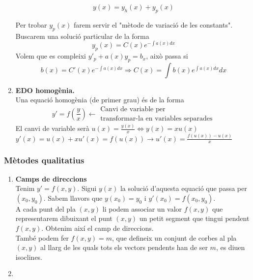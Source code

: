 \documentclass[../main.tex]{subfiles}
\begin{document}
\begin{enumerate}
\begin{corolari}
        \begin{displaymath}
            y(x) = y_h(x) + y_p(x)
        \end{displaymath}
    \end{corolari}
    Per trobar $y_p(x)$ farem servir el "mètode de variació de les constants".
    Buscarem una solució particular de la forma \begin{displaymath}
        y_p(x) = C(x)e^{-\int a(x) dx}
    \end{displaymath}
    Volem que es compleixi $y'_p + a(x)y_p = b_x$, això passa si
    \begin{displaymath}
        b(x) = C'(x)e^{-\int a(x) dx} \Rightarrow C(x) = \int b(x)e^{\int a(x)dx}dx
    \end{displaymath}
    \item \textbf{EDO homogènia.}\\
    Una equació homogènia (de primer grau) és de la forma
    \begin{displaymath}
        y' = f\left(\frac{y}{x}\right) \leftarrow \substack{\text{Canvi de variable per}\\\text{transformar-la en variables separades}}
    \end{displaymath}
    El canvi de variable serà $u(x) = \frac{y(x)}{x} \Leftrightarrow y(x) = xu(x)$\\
    $y'(x) = u(x) + xu'(x) = f(u(x)) \rightarrow u'(x) = \frac{f(u(x))-u(x)}{x}$
\end{enumerate}
\subsubsection{Mètodes qualitatius}
\begin{enumerate}
    \item \textbf{Camps de direccions}\\
    Tenim $y' = f(x,y)$. Sigui $y(x)$ la solució d'aquesta equació que passa per $(x_0, y_0)$. Sabem
    llavors que $y(x_0) = y_0$ i $y'(x_0) = f(x_0, y_0)$.\\
    A cada punt del pla $(x, y)$ li podem associar un valor $f(x,y)$ que representarem dibuixant el
    punt $(x,y)$ un petit segment que tingui pendent $f(x,y)$. Obtenim així el camp de direccions.\\
    També podem fer $f(x,y) = m$, que defineix un conjunt de corbes al pla $(x,y)$ al llarg de les
    quals tots els vectors pendents han de ser $m$, es diuen isoclines.
    \item 
\end{enumerate}
\end{document}
